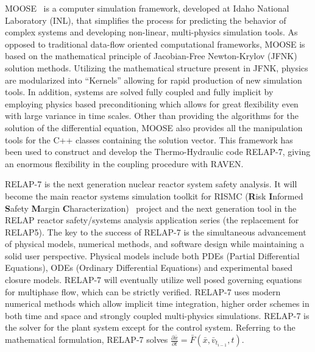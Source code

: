 \documentclass{mc2013}
\begin{document}
\label{sec:MOOSE/RELAP-7}
MOOSE~\cite{MOOSE} is a computer simulation framework,  developed at Idaho National Laboratory (INL), that simplifies the process for predicting the behavior of complex systems and developing non-linear, multi-physics simulation tools. As opposed to traditional data-flow oriented computational frameworks, MOOSE is based on the mathematical principle of Jacobian-Free Newton-Krylov (JFNK) solution methods. Utilizing the mathematical structure present in JFNK, physics are modularized into “Kernels” allowing for rapid production of new simulation tools. In addition, systems are solved fully coupled and fully implicit by employing physics based preconditioning which allows for great flexibility even with large variance in time scales. 
Other than providing the algorithms for the solution of the differential equation, MOOSE also provides all the manipulation tools for the C++ classes containing the solution vector. This framework has been used to construct and develop the Thermo-Hydraulic code RELAP-7, giving an enormous flexibility in the coupling procedure with RAVEN. 

RELAP-7 is the next generation nuclear reactor system safety analysis. It will become the main reactor systems simulation toolkit for RISMC (\textbf{R}isk \textbf{I}nformed \textbf{S}afety \textbf{M}argin \textbf{C}haracterization)~\cite{mandelliANS_RISMC} project and the next generation tool in the RELAP reactor safety/systems analysis application series (the replacement for RELAP5). The key to the success of RELAP-7 is the simultaneous advancement of physical models, numerical methods, and software design while maintaining a solid user perspective. 
Physical models include both PDEs (Partial Differential Equations), ODEs (Ordinary Differential Equations) and experimental based closure models. RELAP-7 will eventually utilize well posed governing equations for multiphase flow, which can be strictly verified. RELAP-7 uses modern numerical methods which allow implicit time integration, higher order schemes in both time and space and strongly coupled multi-physics simulations.
RELAP-7 is the solver for the plant system except for the control system. Referring to the mathematical formulation, RELAP-7 solves 
$\frac{\partial \bar{x}}{\partial t} = \bar{F}(\bar{x},\bar{v}_{t_{i-1}},t)$.

\end{document}
